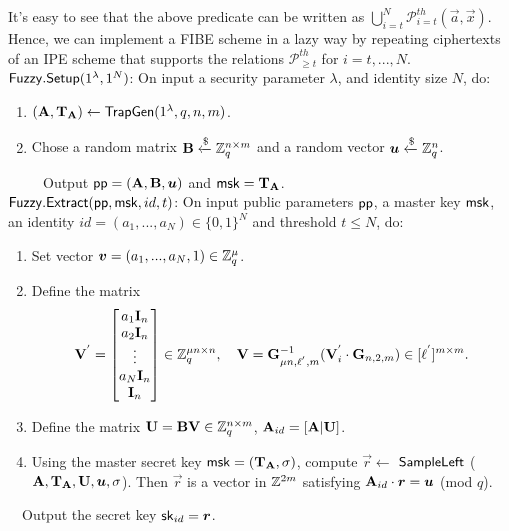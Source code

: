 \documentclass{llncs}
\begin{document}
\begin{appendix}
It's easy to see that the above predicate can be written as $\bigcup^{N}_{i=t}\mathcal{P}^{th}_{i=t}(\vec{a}, \vec{x})$. Hence, we can implement a FIBE scheme in a lazy way by repeating ciphertexts of an IPE scheme that supports the relations $\mathcal{P}^{th}_{\geq t}$ for $i=t,...,N$.\\[0.4cm]
$\mathsf{Fuzzy}.\mathsf{Setup}(1^{\lambda}, 1^{N})$: On input a security parameter $\lambda$, and identity size $N$, do:
\begin{enumerate}
\item $(\textbf{A}, \mathbf{T}_{\mathbf{A}})\leftarrow \mathsf{TrapGen}(1^{\lambda}, q, n, m)$.
\item Chose a random matrix $\mathbf{B}\xleftarrow{\$} \mathbb{Z}^{n \times m}_{q}$ and a random vector $\boldsymbol{u}\xleftarrow{\$} \mathbb{Z}^{n}_{q}$.
\end{enumerate}
~~~~~Output $\mathsf{pp}=(\textbf{A}, \textbf{B}, \boldsymbol{u})$ and $\mathsf{msk}= \mathbf{T}_{\mathbf{A}}$.\\[0.4cm]
$\mathsf{Fuzzy}.\mathsf{Extract}(\mathsf{pp}, \mathsf{msk}, id, t)$: On input public parameters $\mathsf{pp}$, a master key $\mathsf{msk}$, an identity $id= (a_{1},...,a_{N}) \in \{0,1\}^{N}$ and threshold $t \leq N$, do:
\begin{enumerate}
\item Set vector $\boldsymbol{v}=(a_{1},...,a_{N},1) \in \mathbb{Z}^{\mu}_{q}$.
\item Define the matrix
\begin{equation}
 \mathbf{V}^{'}= \begin{bmatrix}
a_{1} \mathbf{I}_{n}\\
a_{2} \mathbf{I}_{n}\\
\vdots\\
a_{N} \mathbf{I}_{n}\\
\mathbf{I}_{n}
\end{bmatrix} \in \mathbb{Z}^{\mu n \times n}_{q},~~~ \mathbf{V}=\mathbf{G}^{-1}_{\mu n,\ell^{'},m}(\mathbf{V}^{'}_{i}\cdot \mathbf{G}_{n,2,m}) \in [\ell^{'}]^{m \times m}.
\end{equation}
\item Define the  matrix $\mathbf{U}=\mathbf{BV} \in \mathbb{Z}^{n \times m}_{q}$, $\mathbf{A}_{id}=[\mathbf{A}|\mathbf{U}]$.\\
\item Using the master secret key $\mathsf{msk}=(\mathbf{T}_{\mathbf{A}},\sigma)$, compute $\vec{r}\leftarrow$ $\mathsf{SampleLeft}$ ($\mathbf{A}, \mathbf{T}_{\mathbf{A}},\mathbf{U}, \boldsymbol{u},\sigma$). Then $\vec{r}$ is a vector in $\mathbb{Z}^{2m}$ satisfying $\mathbf{A}_{id}\cdot \boldsymbol{r}=\boldsymbol{u}$ (mod $q$).
\end{enumerate}
~~Output the secret key $\mathsf{sk}_{id}=\boldsymbol{r}$.\\[0.4cm]

\end{appendix}
\end{document}
